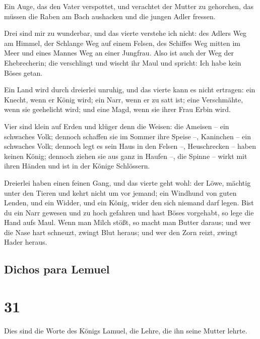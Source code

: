  Ein Auge, das den Vater verspottet, und verachtet der
Mutter zu gehorchen, das müssen die Raben am Bach aushacken und die
jungen Adler fressen.

 Drei sind mir zu wunderbar, und das vierte verstehe ich
nicht:  des Adlers Weg am Himmel, der Schlange Weg auf
einem Felsen, des Schiffes Weg mitten im Meer und eines Mannes Weg an
einer Jungfrau.  Also ist auch der Weg der Ehebrecherin;
die verschlingt und wischt ihr Maul und spricht: Ich habe kein Böses
getan.

 Ein Land wird durch dreierlei unruhig, und das vierte
kann es nicht ertragen:  ein Knecht, wenn er König wird;
ein Narr, wenn er zu satt ist;  eine Verschmähte, wenn
sie geehelicht wird; und eine Magd, wenn sie ihrer Frau Erbin wird.

 Vier sind klein auf Erden und klüger denn die Weisen:
 die Ameisen -- ein schwaches Volk; dennoch schaffen sie
im Sommer ihre Speise --,  Kaninchen -- ein schwaches
Volk; dennoch legt es sein Haus in den Felsen --, 
Heuschrecken -- haben keinen König; dennoch ziehen sie aus ganz in
Haufen --,  die Spinne -- wirkt mit ihren Händen und ist
in der Könige Schlössern.

 Dreierlei haben einen feinen Gang, und das vierte geht
wohl:  der Löwe, mächtig unter den Tieren und kehrt nicht
um vor jemand;  ein Windhund von guten Lenden, und ein
Widder, und ein König, wider den sich niemand darf legen.
 Bist du ein Narr gewesen und zu hoch gefahren und hast
Böses vorgehabt, so lege die Hand aufs Maul.  Wenn man
Milch stößt, so macht man Butter daraus; und wer die Nase hart schneuzt,
zwingt Blut heraus; und wer den Zorn reizt, zwingt Hader heraus.

\hypertarget{dichos-para-lemuel}{%
\subsection{Dichos para Lemuel}\label{dichos-para-lemuel}}

\hypertarget{section-30}{%
\section{31}\label{section-30}}

 Dies sind die Worte des Königs Lamuel, die Lehre, die ihn
seine Mutter lehrte.

